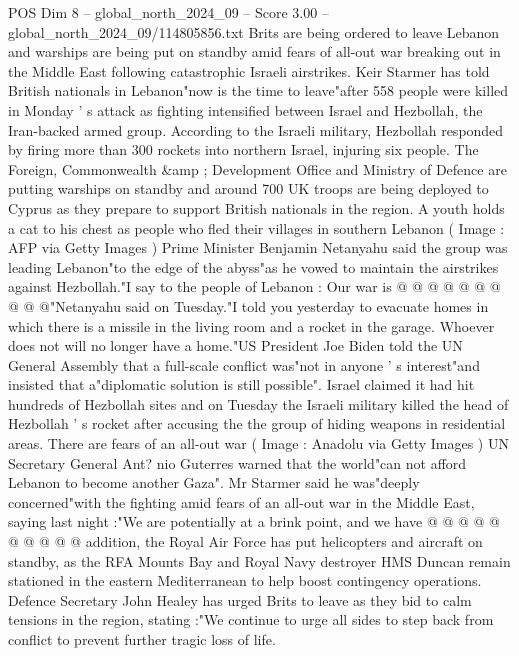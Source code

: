 \begin{textsample}{POS Dim 8 – global\_north\_2024\_09 – Score 3.00 – global\_north\_2024\_09/114805856.txt}  \label{ex:f8_pos_298}
Brits are being ordered to leave Lebanon and warships are being put on standby amid fears of all-out war breaking out in the Middle East following catastrophic Israeli airstrikes.
Keir Starmer has told British nationals in Lebanon"now is the time to leave"after 558 people were killed in Monday ' s attack as fighting intensified between Israel and Hezbollah, the Iran-backed armed group.
According to the Israeli military, Hezbollah responded by firing more than 300 rockets into northern Israel, injuring six people.
The Foreign, Commonwealth \&amp ; Development Office and Ministry of Defence are putting warships on standby and around 700 UK troops are being deployed to Cyprus as they prepare to support British nationals in the region.
A youth holds a cat to his chest as people who fled their villages in southern Lebanon ( Image : AFP via Getty Images ) Prime Minister Benjamin Netanyahu said the group was leading Lebanon"to the edge of the abyss"as he vowed to maintain the airstrikes against Hezbollah."I say to the people of Lebanon : Our war is @ @ @ @ @ @ @ @ @ @"Netanyahu said on Tuesday."I told you yesterday to evacuate homes in which there is a missile in the living room and a rocket in the garage.
Whoever does not will no longer have a home."US President Joe Biden told the UN General Assembly that a full-scale conflict was"not in anyone ' s interest"and insisted that a"diplomatic solution is still possible".
Israel claimed it had hit hundreds of Hezbollah sites and on Tuesday the Israeli military killed the head of Hezbollah ' s rocket after accusing the the group of hiding weapons in residential areas.
There are fears of an all-out war ( Image : Anadolu via Getty Images ) UN Secretary General Ant? nio Guterres warned that the world"can not afford Lebanon to become another Gaza".
Mr Starmer said he was"deeply concerned"with the fighting amid fears of an all-out war in the Middle East, saying last night :"We are potentially at a brink point, and we have @ @ @ @ @ @ @ @ @ @ addition, the Royal Air Force has put helicopters and aircraft on standby, as the RFA Mounts Bay and Royal Navy destroyer HMS Duncan remain stationed in the eastern Mediterranean to help boost contingency operations.
Defence Secretary John Healey has urged Brits to leave as they bid to calm tensions in the region, stating :"We continue to urge all sides to step back from conflict to prevent further tragic loss of life.

\end{textsample}
